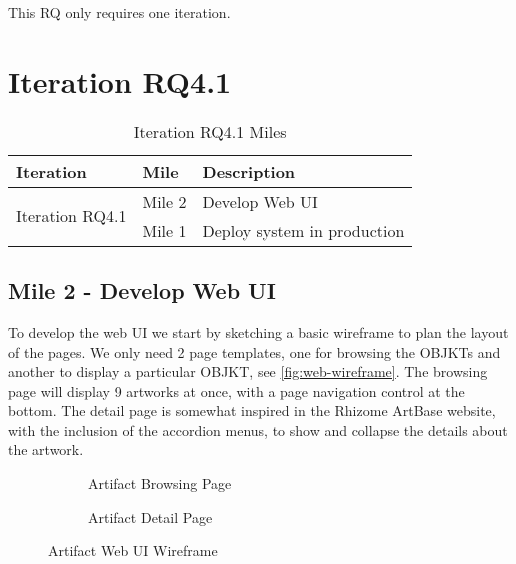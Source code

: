 This RQ only requires one iteration.

\section {Iteration RQ4.1}

\begin{table}[H]
\footnotesize
\centering
\begin{tabular}{|l|c|l|}
\hline
\textbf{Iteration}        & \multicolumn{1}{l|}{\textbf{Mile}} & \textbf{Description}                                         \\ \hline
\multirow{2}{*}{Iteration RQ4.1} & Mile 2                              & Develop Web UI                   \\ \cline{2-3} 
                             & Mile 1                              & Deploy system in production \\ \hline
\end{tabular}
\caption{Iteration RQ4.1 Miles}
\end{table}

\subsection {Mile 2 - Develop Web UI}

To develop the web UI we start by sketching a basic wireframe to plan the layout of the pages. We only need 2 page templates, one for browsing the OBJKTs and another to display a particular OBJKT, see \autoref{fig:web-wireframe}.
The browsing page will display 9 artworks at once, with a page navigation control at the bottom.
The detail page is somewhat inspired in the Rhizome ArtBase website, with the inclusion of the accordion menus, to show and collapse the details about the artwork.

\begin{figure}[h]
  \centering
  \begingroup
  \setlength{\fboxsep}{0pt} %
  \setlength{\fboxrule}{1pt} %
  \begin{subfigure}[b]{0.45\textwidth}
    \centering
    \caption{Artifact Browsing Page}
    \label{fig:wireframe1}
  \end{subfigure}
  \hfill
  \begin{subfigure}[b]{0.45\textwidth}
    \centering
    \caption{Artifact Detail Page}
    \label{fig:wireframe2}
  \end{subfigure}
  \endgroup
  \caption{Artifact Web UI Wireframe}
  \label{fig:web-wireframe}
\end{figure}

